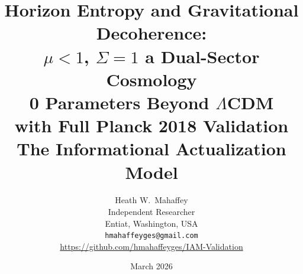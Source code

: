\documentclass[twocolumn,a4paper,aps,prd,twocolumn,showpacs,notitlepage,superscriptaddress,nofootinbib]{article}
\newcommand{\LCDM}{$\Lambda$CDM}
\begin{document}
\onecolumn
\title{\textbf{Horizon Entropy and Gravitational Decoherence:\\
$\mu < 1$, $\Sigma = 1$ a Dual-Sector Cosmology\\
0 Parameters Beyond \LCDM{}\\
with Full Planck 2018 Validation}\\[0.75em]
\large The Informational Actualization Model}
\author{Heath W.\ Mahaffey\\
\small Independent Researcher\\ \small  Entiat, Washington, USA\\
\small \texttt{hmahaffeyges@gmail.com}\\
\small \url{https://github.com/hmahaffeyges/IAM-Validation}}

\date{March 2026}

\maketitle 
\end{document}
